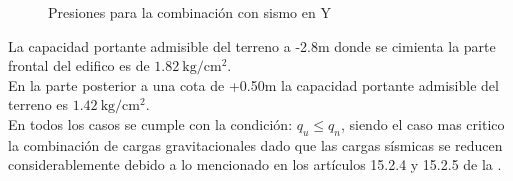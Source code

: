 \documentclass{article}%
\begin{document}
\begin{figure}[h!]
    \centering
    \hspace{10mm}
    \caption{Presiones para la combinación con sismo en Y}
    \label{corw}
\end{figure}
\noindent
La capacidad portante admisible del terreno a -2.8m donde se cimienta la parte frontal del edifico es de $1.82\mathrm{~kg/cm^2} $.\\
En la parte posterior a una cota de +0.50m la capacidad portante admisible del terreno es $1.42\mathrm{~kg/cm^2}$.\\
En todos los casos se cumple con la condición: $q_{u}\leq q_{n}$, siendo el caso mas critico la combinación de cargas gravitacionales dado que las cargas sísmicas se reducen considerablemente debido a lo mencionado en los artículos 15.2.4 y 15.2.5 de la \cite{E-060}.\\
\end{document}
